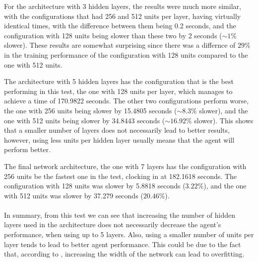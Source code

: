 For the architecture with 3 hidden layers, the results were much more similar, with the configurations that had 256 and 512 units per layer, having virtually identical times, with the difference between them being 0.2 seconds, and the configuration with 128 units being slower than these two by 2 seconds ($\sim1\%$ slower). These results are somewhat surprising since there was a differnce of $29\%$ in the training performance of the configuration with 128 units compared to the one with 512 units.

The architecture with 5 hidden layers has the configuration that is the best performing in this test, the one with 128 units per layer, which manages to achieve a time of 170.9822 seconds. The other two configurations perform worse, the one with 256 units being slower by 15.4805 seconds ($\sim8.3\%$ slower), and the one with 512 units being slower by 34.8443 seconds ($\sim16.92\%$ slower). This shows that a smaller number of layers does not necessarily lead to better results, however, using less units per hidden layer usually means that the agent will perform better.

The final network architecture, the one with 7 layers has the configuration with 256 units be the fastest one in the test, clocking in at 182.1618 seconds. The configuration with 128 units was slower by 5.8818 seconds ($3.22\%$), and the one with 512 units was slower by 37.279 seconds ($20.46\%$).

\paragraph{}
In summary, from this test we can see that increasing the number of hidden layers used in the architecture does not necessarily decrease the agent's performance, when using up to 5 layers. Also, using a smaller number of units per layer tends to lead to better agent performance. This could be due to the fact that, according to \cite{eldan2016powerofdepth}, increasing the width of the network can lead to overfitting.

